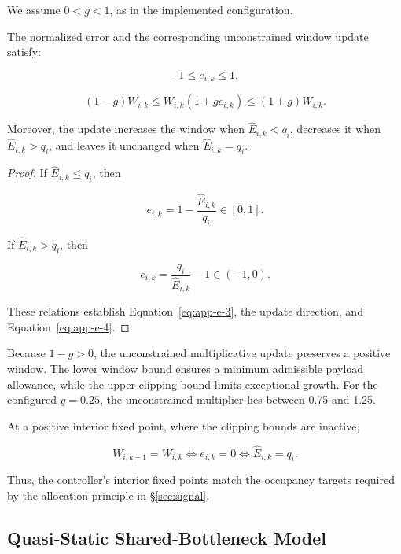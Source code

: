 We assume \(0<g<1\), as in the implemented configuration.

\begin{lemma}
\label{lem:e-1}
The normalized error and the corresponding unconstrained window update satisfy:

\begin{equation}
\label{eq:app-e-3}
-1\le e_{i,k}\le1,
\end{equation}

\begin{equation}
\label{eq:app-e-4}
(1-g)W_{i,k}
\le W_{i,k}(1+ge_{i,k})
\le(1+g)W_{i,k}.
\end{equation}

Moreover, the update increases the window when \(\widehat E_{i,k}<q_i\), decreases it when \(\widehat E_{i,k}>q_i\), and leaves it unchanged when \(\widehat E_{i,k}=q_i\).
\end{lemma}

\begin{proof} If \(\widehat E_{i,k}\le q_i\), then

\[
e_{i,k}=1-\frac{\widehat E_{i,k}}{q_i}\in[0,1].
\]

If \(\widehat E_{i,k}>q_i\), then

\[
e_{i,k}=\frac{q_i}{\widehat E_{i,k}}-1\in(-1,0).
\]

These relations establish Equation~\eqref{eq:app-e-3}, the update direction, and Equation~\eqref{eq:app-e-4}.
\end{proof}

Because \(1-g>0\), the unconstrained multiplicative update preserves a positive window. The lower window bound ensures a minimum admissible payload allowance, while the upper clipping bound limits exceptional growth. For the configured \(g=0.25\), the unconstrained multiplier lies between 0.75 and 1.25.

At a positive interior fixed point, where the clipping bounds are inactive,

\begin{equation}
\label{eq:app-e-5}
W_{i,k+1}=W_{i,k}
\Longleftrightarrow e_{i,k}=0
\Longleftrightarrow \widehat E_{i,k}=q_i.
\end{equation}

Thus, the controller's interior fixed points match the occupancy targets required by the allocation principle in \S\ref{sec:signal}.

\subsection{Quasi-Static Shared-Bottleneck Model}
\label{app:e-2}

